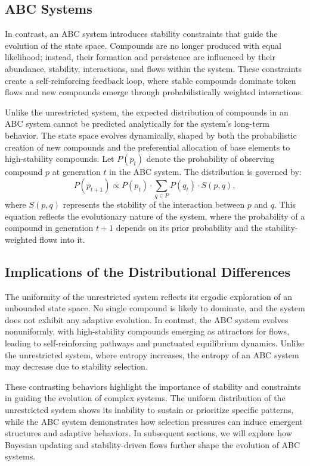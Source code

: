 \documentclass[entropy,article,submit,pdftex,oneauthor]{Definitions/mdpi}
\begin{document}
\subsection{ABC Systems}

In contrast, an ABC system introduces stability constraints that guide the evolution of the state space. Compounds are no longer produced with equal likelihood; instead, their formation and persistence are influenced by their abundance, stability, interactions, and flows within the system. These constraints create a self-reinforcing feedback loop, where stable compounds dominate token flows and new compounds emerge through probabilistically weighted interactions.

Unlike the unrestricted system, the expected distribution of compounds in an ABC system cannot be predicted analytically for the system's long-term behavior. The state space evolves dynamically, shaped by both the probabilistic creation of new compounds and the preferential allocation of base elements to high-stability compounds. Let \( P(p_t) \) denote the probability of observing compound \( p \) at generation \( t \) in the ABC system. The distribution is governed by:
\begin{equation}
P(p_{t+1}) \propto P(p_t) \cdot \sum_{q \in P} P(q_t) \cdot S(p, q),
\end{equation}
where \( S(p, q) \) represents the stability of the interaction between \( p \) and \( q \). This equation reflects the evolutionary nature of the system, where the probability of a compound in generation \( t+1 \) depends on its prior probability and the stability-weighted flows into it. 

\subsection{Implications of the Distributional Differences}

The uniformity of the unrestricted system reflects its ergodic exploration of an unbounded state space. No single compound is likely to dominate, and the system does not exhibit any adaptive evolution. In contrast, the ABC system evolves nonuniformly, with high-stability compounds emerging as attractors for flows, leading to self-reinforcing pathways and punctuated equilibrium \cite{gould1977punctuated} dynamics. Unlike the unrestricted system, where entropy increases, the entropy of an ABC system may decrease due to stability selection.

These contrasting behaviors highlight the importance of stability and constraints in guiding the evolution of complex systems. The uniform distribution of the unrestricted system shows its inability to sustain or prioritize specific patterns, while the ABC system demonstrates how selection pressures can induce emergent structures and adaptive behaviors. In subsequent sections, we will explore how Bayesian updating and stability-driven flows further shape the evolution of ABC systems.
\end{document}
